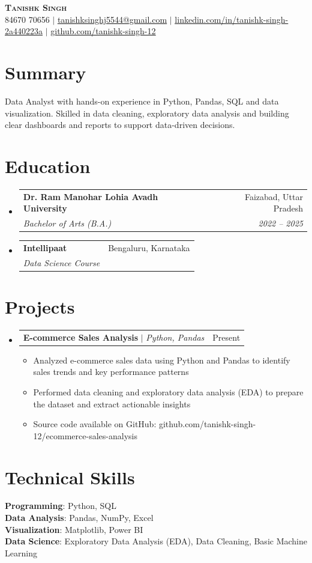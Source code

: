 \documentclass[letterpaper,11pt]{article}
\makeatletter
\newcommand{\resumeItem}[1]{
  \item\small{
    {#1 \vspace{-2pt}}
  }
}
\newcommand{\resumeSubheading}[4]{
  \vspace{-2pt}\item
    \begin{tabular*}{0.97\textwidth}[t]{l@{\extracolsep{\fill}}r}
      \textbf{#1} & #2 \\
      \textit{\small#3} & \textit{\small #4} \\
    \end{tabular*}\vspace{-7pt}
}
\newcommand{\resumeProjectHeading}[2]{
    \item
    \begin{tabular*}{0.97\textwidth}{l@{\extracolsep{\fill}}r}
      \small#1 & #2 \\
    \end{tabular*}\vspace{-7pt}
}
\newcommand{\resumeSubHeadingListStart}{\begin{itemize}[leftmargin=0.15in, label={}]}
\newcommand{\resumeSubHeadingListEnd}{\end{itemize}}
\newcommand{\resumeItemListStart}{\begin{itemize}}
\newcommand{\resumeItemListEnd}{\end{itemize}\vspace{-5pt}}
\makeatother
\begin{document}
\begin{center}
    \textbf{\Huge \scshape Tanishk Singh} \\ \vspace{1pt}
    \small 84670 70656 $|$ \href{mailto:tanishksinghj5544@gmail.com}{\underline{tanishksinghj5544@gmail.com}} $|$
    \href{https://linkedin.com/in/tanishk-singh-2a440223a}{\underline{linkedin.com/in/tanishk-singh-2a440223a}} $|$
    \href{https://github.com/tanishk-singh-12}{\underline{github.com/tanishk-singh-12}}
\end{center}

\section{Summary}
  Data Analyst with hands-on experience in Python, Pandas, SQL and data visualization. Skilled in data cleaning, exploratory data analysis and building clear dashboards and reports to support data-driven decisions.

\section{Education}
  \resumeSubHeadingListStart
    \resumeSubheading
      {Dr. Ram Manohar Lohia Avadh University}{Faizabad, Uttar Pradesh}
      {Bachelor of Arts (B.A.)}{2022 -- 2025}
    \resumeSubheading
      {Intellipaat}{Bengaluru, Karnataka}
      {Data Science Course}{}
  \resumeSubHeadingListEnd

\section{Projects}
    \resumeSubHeadingListStart
      \resumeProjectHeading
          {\textbf{E-commerce Sales Analysis} $|$ \emph{Python, Pandas}}{Present}
          \resumeItemListStart
            \resumeItem{Analyzed e-commerce sales data using Python and Pandas to identify sales trends and key performance patterns}
            \resumeItem{Performed data cleaning and exploratory data analysis (EDA) to prepare the dataset and extract actionable insights}
            \resumeItem{Source code available on GitHub: github.com/tanishk-singh-12/ecommerce-sales-analysis}
          \resumeItemListEnd
    \resumeSubHeadingListEnd

\section{Technical Skills}
 \begin{itemize}[leftmargin=0.15in, label={}]
    \small{\item{
     \textbf{Programming}{: Python, SQL} \\
     \textbf{Data Analysis}{: Pandas, NumPy, Excel} \\
     \textbf{Visualization}{: Matplotlib, Power BI} \\
     \textbf{Data Science}{: Exploratory Data Analysis (EDA), Data Cleaning, Basic Machine Learning}
    }}
 \end{itemize}

\end{document}
